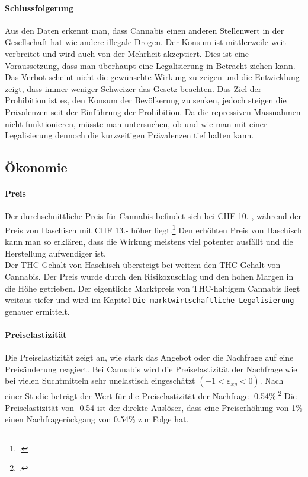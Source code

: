 \documentclass[../main.tex]{subfiles}
\begin{document}
	\paragraph{Schlussfolgerung}
	Aus den Daten erkennt man, dass Cannabis einen anderen Stellenwert in der Gesellschaft hat wie andere illegale Drogen.
	Der Konsum ist mittlerweile weit verbreitet und wird auch von der Mehrheit akzeptiert.
	Dies ist eine Voraussetzung, dass man überhaupt eine Legalisierung in Betracht ziehen kann.
	Das Verbot scheint nicht die gewünschte Wirkung zu zeigen und die Entwicklung zeigt, dass immer weniger Schweizer das Gesetz beachten.
	Das Ziel der Prohibition ist es, den Konsum der Bevölkerung zu senken, jedoch steigen die Prävalenzen seit der Einführung der Prohibition.
	Da die repressiven Massnahmen nicht funktionieren, müsste man untersuchen, ob und wie man mit einer Legalisierung dennoch die kurzzeitigen Prävalenzen tief halten kann.
	
	
	\subsection{Ökonomie}
	
	\paragraph{Preis}
	Der durchschnittliche Preis für Cannabis befindet sich bei CHF 10.-, während der Preis von Haschisch mit CHF 13.- höher liegt.\footcite{zobel}
	Den erhöhten Preis von Haschisch kann man so erklären, dass die Wirkung meistens viel potenter ausfällt und die Herstellung aufwendiger ist.\\
	
	\noindent
	Der THC Gehalt von Haschisch übersteigt bei weitem den THC Gehalt von Cannabis.
	Der Preis wurde durch den Risikozuschlag und den hohen Margen in die Höhe getrieben.
	Der eigentliche Marktpreis von THC-haltigem Cannabis liegt weitaus tiefer und wird im Kapitel \texttt{Die marktwirtschaftliche Legalisierung} genauer ermittelt.
	
	\paragraph{Preiselastizität}
	Die Preiselastizität zeigt an, wie stark das Angebot oder die Nachfrage auf eine Preisänderung reagiert.
	Bei Cannabis wird die Preiselastizität der Nachfrage wie bei vielen Suchtmitteln sehr unelastisch eingeschätzt $(-1<\varepsilon_{xy}<0)$. 
	Nach einer Studie beträgt der Wert für die Preiselastizität der Nachfrage -0.54\%.\footcite{golzar}
	Die Preiselastizität von -0.54 ist der direkte Auslöser, dass eine Preiserhöhung von 1\% einen Nachfragerückgang von 0.54\% zur Folge hat.\\
	
\end{document}
